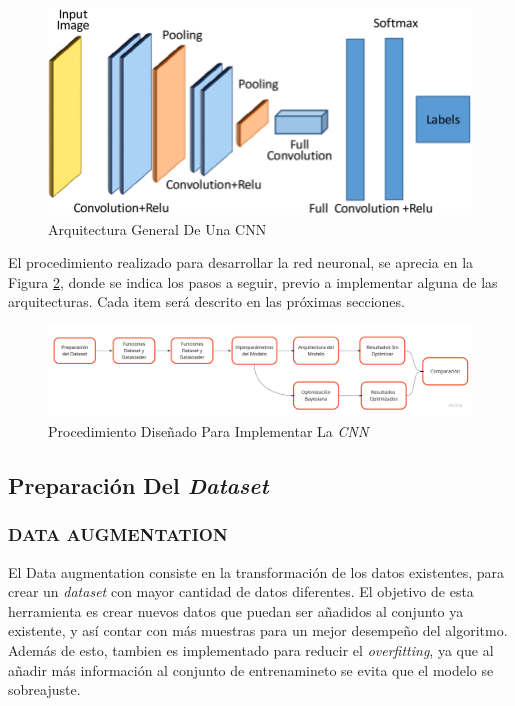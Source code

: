 	\begin{figure}[ht]
		\centering
		\includegraphics[scale=0.25]{Figs/A-generic-CNN-Architecture.png}
		\caption{Arquitectura General De Una CNN}
		\label{fig:cnnarchitecture}
	\end{figure}	
	
	El procedimiento realizado para desarrollar la red neuronal, se aprecia en la Figura \ref{fig:procedimiento}, donde se indica los pasos a seguir, previo a implementar alguna de las arquitecturas. Cada item será descrito en las próximas secciones.  


	\begin{figure}[ht]
		\centering
		\includegraphics[scale=0.2]{Figs/procedimiento.jpg}
		\caption{Procedimiento Diseñado Para Implementar La \textit{CNN}}
		\label{fig:procedimiento}
	\end{figure}	


		\newpage
		\subsection{Preparación Del \textit{Dataset}}
			
			\subsubsection{DATA AUGMENTATION}

			El Data augmentation consiste en la transformación de los datos existentes, para crear un \textit{dataset} con mayor cantidad de datos diferentes. El objetivo de esta herramienta es crear nuevos datos que puedan ser añadidos al conjunto ya existente, y así contar con más muestras para un mejor desempeño del algoritmo. Además de esto, tambien es implementado para reducir el \textit{overfitting}, ya que al añadir más información al conjunto de entrenamineto se evita que el modelo se sobreajuste. \\


